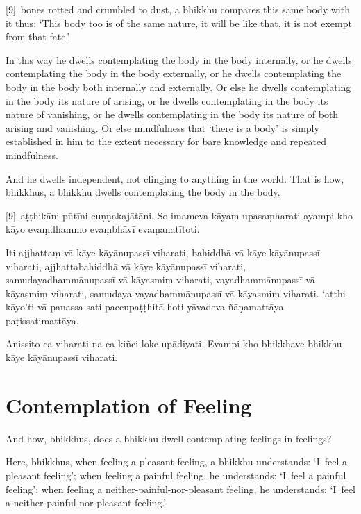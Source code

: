 \englishPage

[9]~bones rotted and crumbled to dust, a bhikkhu compares this same
body with it thus: ‘This body too is of the same nature, it will be like that,
it is not exempt from that fate.’

In this way he dwells contemplating the body in the body internally, or he
dwells contemplating the body in the body externally, or he dwells contemplating
the body in the body both internally and externally. Or else he dwells
contemplating in the body its nature of arising, or he dwells contemplating in
the body its nature of vanishing, or he dwells contemplating in the body its
nature of both arising and vanishing. Or else mindfulness that ‘there is a body’
is simply established in him to the extent necessary for bare knowledge and
repeated mindfulness.

And he dwells independent, not clinging to anything in the world. That is how,
bhikkhus, a bhikkhu dwells contemplating the body in the body.



\paliPage

[9]~aṭṭhikāni pūtīni cuṇṇakajātāni. So imameva kāyaṃ
upasaṃharati ayampi kho kāyo evaṃdhammo evaṃbhāvī evaṃanatītoti.

Iti ajjhattaṃ vā kāye kāyānupassī viharati, bahiddhā vā kāye kāyānupassī
viharati, ajjhattabahiddhā vā kāye kāyānupassī viharati, samudayadhammānupassī
vā kāyasmiṃ viharati, vayadhammānupassī vā kāyasmiṃ viharati,
samudaya-vayadhammānupassī vā kāyasmiṃ viharati. `atthi kāyo'ti vā panassa sati
paccupaṭṭhitā hoti yāvadeva ñāṇamattāya paṭissatimattāya.

Anissito ca viharati na ca kiñci loke upādiyati. Evampi kho bhikkhave bhikkhu
kāye kāyānupassī viharati.



\englishPage
\chapter{Contemplation of Feeling}

And how, bhikkhus, does a bhikkhu dwell contemplating feelings in feelings?

Here, bhikkhus, when feeling a pleasant feeling, a bhikkhu understands:
`I~feel a pleasant feeling';
when feeling a painful feeling, he understands:
`I~feel a painful feeling';
when feeling a neither-painful-nor-pleasant feeling, he understands:
`I~feel a neither-painful-nor-pleasant feeling.'

